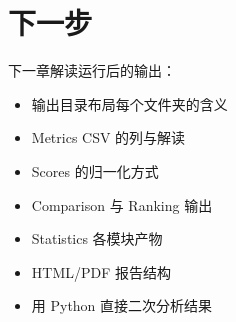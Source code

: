 \section{下一步}

下一章解读运行后的输出：

\begin{itemize}
  \item 输出目录布局每个文件夹的含义
  \item Metrics CSV 的列与解读
  \item Scores 的归一化方式
  \item Comparison 与 Ranking 输出
  \item Statistics 各模块产物
  \item HTML/PDF 报告结构
  \item 用 Python 直接二次分析结果
\end{itemize}
